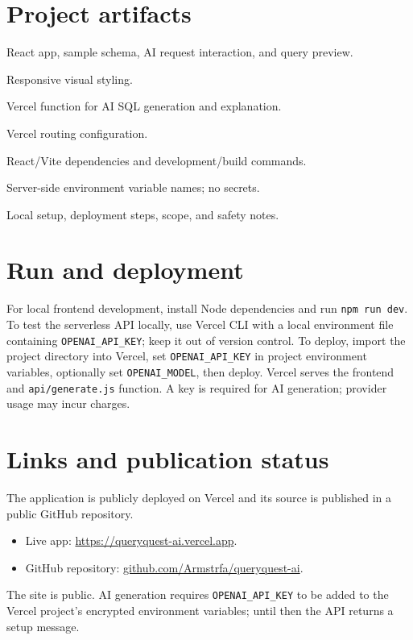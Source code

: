 \documentclass[11pt]{article}
\begin{document}
\section{Project artifacts}
\begin{description}[leftmargin=1.55in,style=nextline,itemsep=4pt]
\item[\texttt{src/main.jsx}] React app, sample schema, AI request interaction, and query preview.
\item[\texttt{src/style.css}] Responsive visual styling.
\item[\texttt{api/generate.js}] Vercel function for AI SQL generation and explanation.
\item[\texttt{vercel.json}] Vercel routing configuration.
\item[\texttt{package.json}] React/Vite dependencies and development/build commands.
\item[\texttt{.env.example}] Server-side environment variable names; no secrets.
\item[\texttt{README.md}] Local setup, deployment steps, scope, and safety notes.
\end{description}
\section{Run and deployment}
For local frontend development, install Node dependencies and run \texttt{npm run dev}. To test the serverless API locally, use Vercel CLI with a local environment file containing \texttt{OPENAI\_API\_KEY}; keep it out of version control.
To deploy, import the project directory into Vercel, set \texttt{OPENAI\_API\_KEY} in project environment variables, optionally set \texttt{OPENAI\_MODEL}, then deploy. Vercel serves the frontend and \texttt{api/generate.js} function. A key is required for AI generation; provider usage may incur charges.
\section{Links and publication status}
The application is publicly deployed on Vercel and its source is published in a public GitHub repository.
\begin{itemize}\item Live app: \href{https://queryquest-ai.vercel.app}{https://queryquest-ai.vercel.app}.\item GitHub repository: \href{https://github.com/Armstrfa/queryquest-ai}{github.com/Armstrfa/queryquest-ai}.\end{itemize}
The site is public. AI generation requires \texttt{OPENAI\_API\_KEY} to be added to the Vercel project's encrypted environment variables; until then the API returns a setup message.
\end{document}
